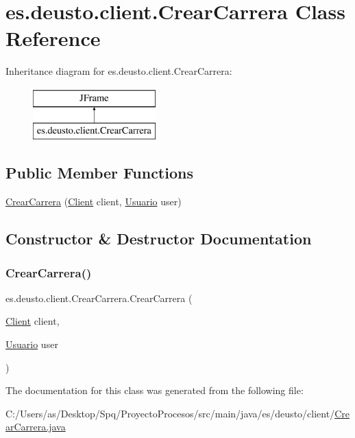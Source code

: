 \hypertarget{classes_1_1deusto_1_1client_1_1_crear_carrera}{}\section{es.\+deusto.\+client.\+Crear\+Carrera Class Reference}
\label{classes_1_1deusto_1_1client_1_1_crear_carrera}
Inheritance diagram for es.\+deusto.\+client.\+Crear\+Carrera\+:\begin{figure}[H]
\begin{center}
\leavevmode
\includegraphics[height=2.000000cm]{classes_1_1deusto_1_1client_1_1_crear_carrera}
\end{center}
\end{figure}
\subsection*{Public Member Functions}
\begin{DoxyCompactItemize}
\item 
\mbox{\hyperlink{classes_1_1deusto_1_1client_1_1_crear_carrera_ab7396c374d289ed38a61d07e6787c43b}{Crear\+Carrera}} (\mbox{\hyperlink{classes_1_1deusto_1_1client_1_1_client}{Client}} client, \mbox{\hyperlink{classes_1_1deusto_1_1server_1_1jdo_1_1_usuario}{Usuario}} user)
\end{DoxyCompactItemize}


\subsection{Constructor \& Destructor Documentation}
\mbox{\label{classes_1_1deusto_1_1client_1_1_crear_carrera_ab7396c374d289ed38a61d07e6787c43b}} 
\subsubsection{\texorpdfstring{CrearCarrera()}{CrearCarrera()}}
{\footnotesize\ttfamily es.\+deusto.\+client.\+Crear\+Carrera.\+Crear\+Carrera (\begin{DoxyParamCaption}\item[{\mbox{\hyperlink{classes_1_1deusto_1_1client_1_1_client}{Client}}}]{client,  }\item[{\mbox{\hyperlink{classes_1_1deusto_1_1server_1_1jdo_1_1_usuario}{Usuario}}}]{user }\end{DoxyParamCaption})}



The documentation for this class was generated from the following file\+:\begin{DoxyCompactItemize}
\item 
C\+:/\+Users/as/\+Desktop/\+Spq/\+Proyecto\+Procesos/src/main/java/es/deusto/client/\mbox{\hyperlink{_crear_carrera_8java}{Crear\+Carrera.\+java}}\end{DoxyCompactItemize}
